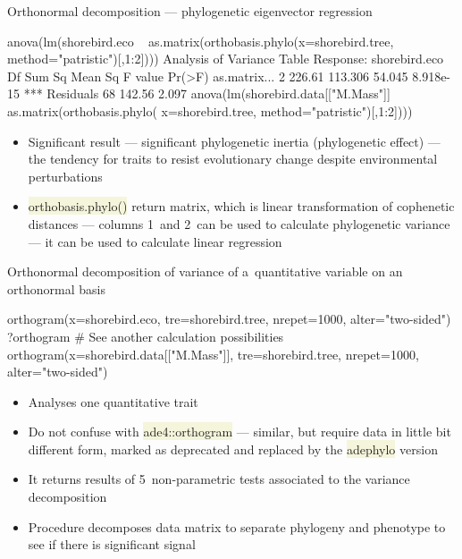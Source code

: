 \documentclass[compress, xelatex, 11pt, xcolor=svgnames, aspectratio=169,
	hyperref={
		bookmarks=true,
		unicode=true,
		colorlinks=true,
		pdftitle={Molecular data in R},
		plainpages=false,
		pdfauthor={Vojtech Zeisek},
		pdfsubject={Course about phylogeny and evolution in R},
		pdfcreator={XeLaTeX},
		pdfkeywords={R, evolution, phylogeny, molecular data},
		linkcolor=Crimson, %
		anchorcolor=Magenta, %
		citecolor=Magenta, %
		filecolor=Magenta, %
		menucolor=Magenta, %
		urlcolor=DodgerBlue, %
		},
	url={hyphens, lowtilde} %
	]{beamer}
\renewcommand{\texttt}[1]{\colorbox{Beige}{{\ttfamily #1}}}
\begin{document}
\begin{frame}[fragile]{Orthonormal decomposition --- phylogenetic eigenvector regression}
	\begin{spluscode}
    anova(lm(shorebird.eco ~ as.matrix(orthobasis.phylo(x=shorebird.tree,
      method="patristic")[,1:2])))
    Analysis of Variance Table
    Response: shorebird.eco
                 Df Sum Sq Mean Sq F value    Pr(>F)
    as.matrix...  2 226.61 113.306  54.045 8.918e-15 ***
    Residuals    68 142.56   2.097
    anova(lm(shorebird.data[["M.Mass"]] ~ as.matrix(orthobasis.phylo(
      x=shorebird.tree, method="patristic")[,1:2])))
	\end{spluscode}
	\begin{itemize}
		\item Significant result --- significant phylogenetic inertia (phylogenetic effect) --- the tendency for traits to resist evolutionary change despite environmental perturbations
		\item \texttt{orthobasis.phylo()} return matrix, which is linear transformation of cophenetic distances --- columns 1~and 2~can be used to calculate phylogenetic variance --- it can be used to calculate linear regression
	\end{itemize}
\end{frame}

\begin{frame}[fragile]{Orthonormal decomposition of variance of a~quantitative variable on an orthonormal basis}
	\begin{spluscode}
    orthogram(x=shorebird.eco, tre=shorebird.tree, nrepet=1000,
      alter="two-sided")
    ?orthogram # See another calculation possibilities
    orthogram(x=shorebird.data[["M.Mass"]], tre=shorebird.tree, nrepet=1000,
      alter="two-sided")
	\end{spluscode}
	\begin{itemize}
		\item Analyses one quantitative trait
		\item Do not confuse with \texttt{ade4::orthogram} --- similar, but require data in little bit different form, marked as deprecated and replaced by the \texttt{adephylo} version
		\item It returns results of 5~non-parametric tests associated to the variance decomposition
		\item Procedure decomposes data matrix to separate phylogeny and phenotype to see if there is significant signal
	\end{itemize}
\end{frame}
\end{document}
